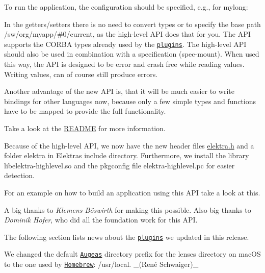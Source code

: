 To run the application, the configuration should be specified, e.\+g., for mylong\+:




In the getters/setters there is no need to convert types or to specify the base path {\ttfamily /sw/org/myapp/\#0/current}, as the high-\/level A\+PI does that for you. The A\+PI supports the C\+O\+R\+BA types already used by the \href{https://www.libelektra.org/plugins/type}{\tt plugins}. The high-\/level A\+PI should also be used in combination with a specification ({\ttfamily spec-\/mount}). When used this way, the A\+PI is designed to be error and crash free while reading values. Writing values, can of course still produce errors.

Another advantage of the new A\+PI is, that it will be much easier to write bindings for other languages now, because only a few simple types and functions have to be mapped to provide the full functionality.

Take a look at the \hyperlink{src_libs_highlevel_README_md}{R\+E\+A\+D\+ME} for more information.

Because of the high-\/level A\+PI, we now have the new header files {\ttfamily \hyperlink{elektra_8h}{elektra.\+h}} and a folder {\ttfamily elektra} in Elektra\textquotesingle{}s include directory. Furthermore, we install the library {\ttfamily libelektra-\/highlevel.\+so} and the pkgconfig file {\ttfamily elektra-\/highlevel.\+pc} for easier detection.

For an example on how to build an application using this A\+PI take a look at this.

A big thanks to {\itshape Klemens Böswirth} for making this possible. Also big thanks to {\itshape Dominik Hofer}, who did all the foundation work for this A\+PI.

The following section lists news about the \href{https://www.libelektra.org/plugins/readme}{\tt plugins} we updated in this release.


\begin{DoxyItemize}
\item We changed the default \href{http://augeas.net}{\tt Augeas} directory prefix for the lenses directory on mac\+OS to the one used by \href{https://brew.sh}{\tt Homebrew}\+: {\ttfamily /usr/local}. \+\_\+(René Schwaiger)\+\_\+
\end{DoxyItemize}


